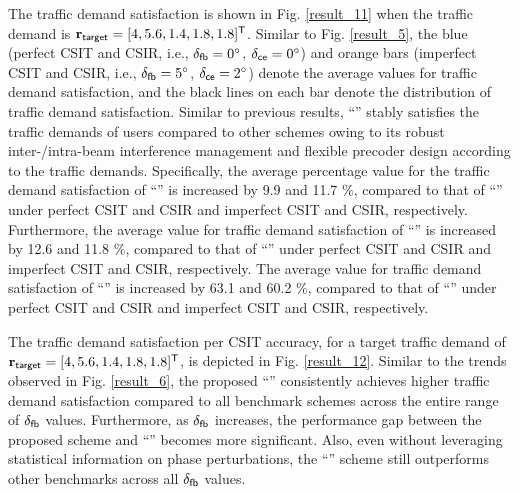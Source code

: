 \documentclass[draftclsnofoot, onecolumn, comsoc, 12pt]{IEEEtran}
\begin{document}
{The traffic demand satisfaction is shown in Fig. \ref{result_11} when the traffic demand is $\mathbf{r}_{\sf{target}} = [4, 5.6, 1.4, 1.8, 1.8]^{\sf{T}}$.} Similar to Fig. \ref{result_5}, the blue (perfect CSIT and CSIR, i.e., $\delta_{\sf{fb}} = 0^{\circ}$, $\delta_{\sf{ce}} = 0^{\circ}$) and orange bars (imperfect CSIT and CSIR, i.e., $\delta_{\sf{fb}} = 5^{\circ}$, $\delta_{\sf{ce}} = 2^{\circ}$) denote the average values for traffic demand satisfaction, and the black lines on each bar denote the distribution of traffic demand satisfaction. 
Similar to previous results, ``{}'' stably satisfies the traffic demands of users compared to other schemes owing to its robust inter-/intra-beam interference management and flexible precoder design according to the traffic demands.
{Specifically, the average percentage value for the traffic demand satisfaction of ``{}'' is increased by 9.9 and 11.7 $\%$, compared to that of ``{}'' under perfect CSIT and CSIR and imperfect CSIT and CSIR, respectively.}
{Furthermore, the average value for traffic demand satisfaction of ``{}'' is increased by 12.6 and 11.8 $\%$, compared to that of ``{}'' under perfect CSIT and CSIR and imperfect CSIT and CSIR, respectively.} {The average value for traffic demand satisfaction of ``{}'' is increased by 63.1 and 60.2 $\%$, compared to that of ``{}'' under perfect CSIT and CSIR and imperfect CSIT and CSIR, respectively.}


{ The traffic demand satisfaction per CSIT accuracy, for a target traffic demand of $\mathbf{r}_{\sf{target}} = [4, 5.6, 1.4, 1.8, 1.8]^{\sf{T}}$, is depicted in Fig. \ref{result_12}. Similar to the trends observed in Fig. \ref{result_6}, the proposed ``{}'' consistently achieves higher traffic demand satisfaction compared to all benchmark schemes across the entire range of $\delta_{\sf{fb}}$ values. Furthermore, as $\delta_{\sf{fb}}$ increases, the performance gap between the proposed scheme and ``{}'' becomes more significant. Also, even without leveraging statistical information on phase perturbations, the ``{}'' scheme still outperforms other benchmarks across all $\delta_{\sf{fb}}$ values.}


\end{document}
